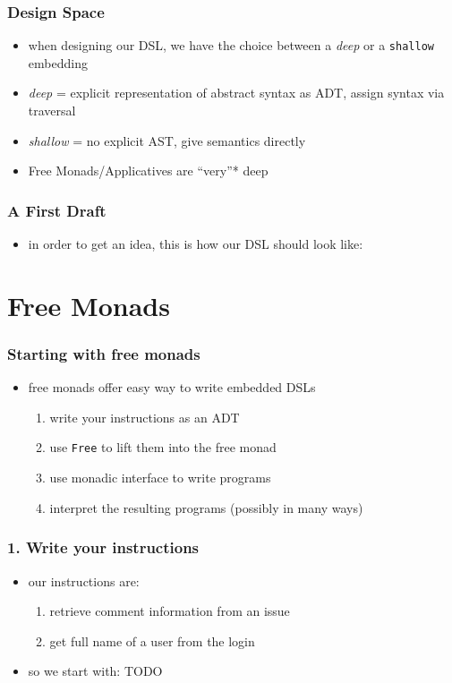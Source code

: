 \documentclass[compress]{beamer}
\begin{document}
\begin{frame}
  \frametitle{Design Space}
  \begin{itemize}
  \item when designing our DSL, we have the choice between a
    \textit{deep} or a \texttt{shallow} embedding
  \item \textit{deep} = explicit representation of abstract syntax as
    ADT, assign syntax via traversal
  \item \textit{shallow} = no explicit AST, give semantics directly
  \item Free Monads/Applicatives are ``very''* deep
  \end{itemize}
\end{frame}

\begin{frame}
  \frametitle{A First Draft}
  \begin{itemize}
  \item in order to get an idea, this is how our DSL should look like:
  \end{itemize}
\end{frame}

\section{Free Monads}
\label{sec:free-monads}

\begin{frame}
  \frametitle{Starting with free monads}
  \begin{itemize}
  \item free monads offer easy way to write embedded DSLs
    \begin{enumerate}
    \item write your instructions as an ADT
    \item use \texttt{Free} to lift them into the free monad
    \item use monadic interface to write programs
    \item interpret the resulting programs (possibly in many ways)
    \end{enumerate}
  \end{itemize}
\end{frame}

\begin{frame}
  \frametitle{1. Write your instructions}
  \begin{itemize}
  \item our instructions are:
    \begin{enumerate}
    \item retrieve comment information from an issue
    \item get full name of a user from the login
    \end{enumerate}
  \item so we start with:
    TODO
  \end{itemize}
\end{frame}
\end{document}
